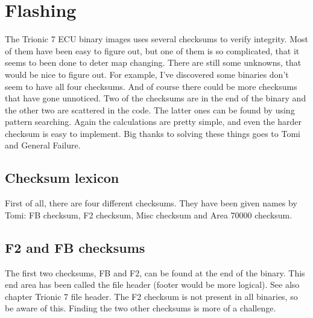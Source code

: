 \documentclass[11pt,a4paper]{book}
\begin{document}
\chapter{Flashing}
The Trionic 7 ECU binary images uses several checksums to verify integrity. Most
of them have been easy to figure out, but one of them is so complicated, that it
seems to been done to deter map changing. There are still some unknowns, that
would be nice to figure out. For example, I've discovered some binaries don't
seem to have all four checksums. And of course there could be more checksums
that have gone unnoticed. Two of the checksums are in the end of the binary and
the other two are scattered in the code. The latter ones can be found by using
pattern searching. Again the calculations are pretty simple, and even the harder
checksum is easy to implement. Big thanks to solving these things goes to Tomi
and General Failure.

\section{Checksum lexicon}
First of all, there are four different checksums. They have been given names by
Tomi: FB checksum, F2 checksum, Misc checksum and Area 70000 checksum.

\section{F2 and FB checksums}
The first two checksums, FB and F2, can be found at the end of the binary. This
end area has been called the file header (footer would be more logical). See
also chapter Trionic 7 file header. The F2 checksum is not
present in all binaries, so be aware of this. Finding the two other checksums is
more of a challenge.
\end{document}
